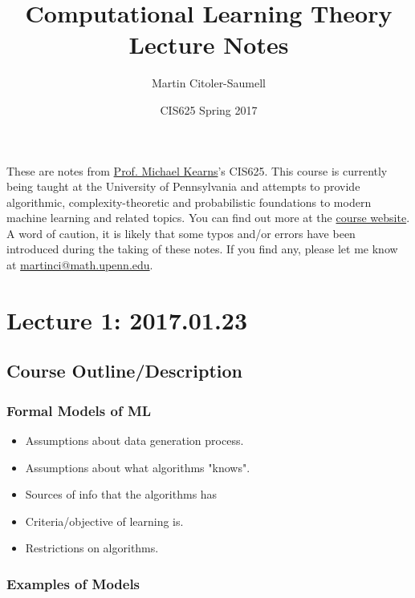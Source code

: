 \documentclass[12pt, letterpaper]{article}
\title{Computational Learning Theory Lecture Notes}
\author{Martin Citoler-Saumell}
\date{CIS625 Spring 2017}
\numberwithin{equation}{section} %
\theoremstyle{definition}
\theoremstyle{remark}
\begin{document}
\maketitle

These are notes from \href{http://www.cis.upenn.edu/~mkearns/}{Prof. Michael Kearns}'s CIS625. 
This course is currently being taught at the University of Pennsylvania and attempts to provide algorithmic, complexity-theoretic and probabilistic foundations to modern machine learning and related topics.
 You can find out more at the \href{http://www.cis.upenn.edu/~mkearns/teaching/COLT/}{course website}. 
 A word of caution, it is likely that some typos and/or errors have been introduced during the taking of these notes. If you find any, please let me know at \href{mailto:martinci@math.upenn.edu}{martinci@math.upenn.edu}.

\tableofcontents

\section{Lecture 1: 2017.01.23}

\subsection{Course Outline/Description}

\subsubsection{Formal Models of ML}

\begin{itemize}
	\item Assumptions about data generation process.
	\item Assumptions about what algorithms "knows".
	\item Sources of info that the algorithms has
	\item Criteria/objective of learning is.
	\item Restrictions on algorithms.
\end{itemize}
	
\subsubsection{Examples of Models}
\end{document}
